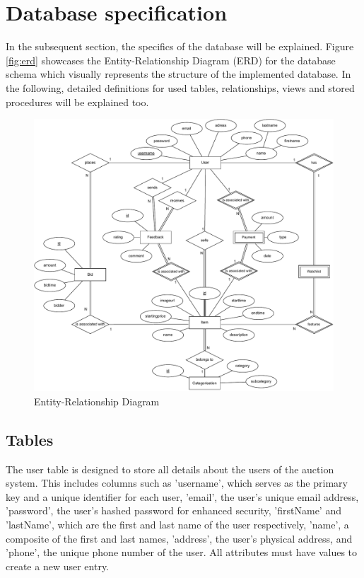 \chapter{Database specification}

In the subsequent section, the specifics of the database will be explained. Figure \ref{fig:erd} showcases the Entity-Relationship Diagram (ERD) for the database schema which visually represents the structure of the implemented database. In the following, detailed definitions for used tables, relationships, views and stored procedures will be explained too.

\begin{figure}[htbp]
	\centering
	\includegraphics[width=0.7\textheight]{img/ERD-Chen.pdf}
	\caption{Entity-Relationship Diagram}
	\label{fig:erd-chen}
\end{figure}

\section{Tables}

The user table is designed to store all details about the users of the auction system. This includes columns such as 'username', which serves as the primary key and a unique identifier for each user, 'email', the user's unique email address, 'password', the user's hashed password for enhanced security, 'firstName' and 'lastName', which are the first and last name of the user respectively, 'name', a composite of the first and last names, 'address', the user's physical address, and 'phone', the unique phone number of the user. All attributes must have values to create a new user entry.

